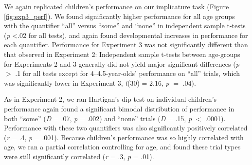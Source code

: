 \documentclass[man]{apa2}
\begin{document}
We again replicated children's performance on our implicature task (Figure \ref{fig:exp3_perf}). We found significantly higher performance for all age groups with the quantifier ``all'' versus ``some'' and ``none'' in independent sample t-tests (\emph{p} \textless .02 for all tests), and again found developmental increases in performance for each quantifier. Performance for  Experiment 3 was not significantly different than that observed in Experiment 2: Independent sample t-tests between age-groups for Experiments 2 and 3 generally did not yield major significant differences (\emph{p} $>$ .1 for all tests except for 4--4.5-year-olds' performance on ``all'' trials, which was significantly lower in Experiment 3, \emph{t}(30) = 2.16, \emph{p} $=$ .04).


As in Experiment 2, we ran Hartigan's dip test on individual children's performance again found a significant bimodal distribution of performance in both ``some'' (\textit{D} = .07, \textit{p} = .002) and ``none'' trials (\textit{D} = .15, \textit{p} $<$ .0001). Performance with these two quantifiers was also significantly positively correlated (\emph{r} = .4, \emph{p} = .001). Because children's performance was so highly correlated with age, we ran a partial correlation controlling for age, and found these trial types were still significantly correlated (\emph{r} = .3, \emph{p} = .01).


%
\end{document}
